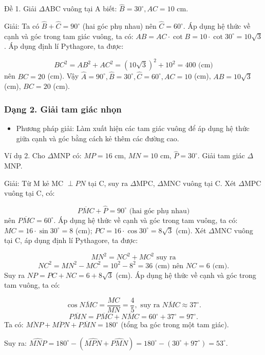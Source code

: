 \documentclass[%
    fontsize=12pt,%
    chapterprefix=false,%
    open=right,%
    twoside=false,%
    numbers=noenddot,%
    headings=optiontohead,%
    final,%
    DIV=15,%
    parskip=half %
]{scrbook}
\begin{document}

Đề 1. Giải $\Delta$ABC vuông tại A biết: $ \hat{B} = 30^\circ, AC = 10 $ cm.

Giải: Ta có $ \hat{B} + \hat{C} = 90^\circ $ (hai góc phụ nhau) nên $ \hat{C} = 60^\circ $. Áp dụng hệ thức về cạnh và góc trong tam giác vuông, ta có: $ AB = AC \cdot \cot B = 10 \cdot \cot 30^\circ = 10\sqrt{3} $. Áp dụng định lí Pythagore, ta được:

\[
BC^2 = AB^2 + AC^2 = \left(10\sqrt{3}\right)^2 + 10^2 = 400 \text{ (cm)}
\]
nên $ BC = 20 $ (cm). Vậy $ \hat{A} = 90^\circ, \hat{B} = 30^\circ, \hat{C} = 60^\circ, AC = 10 $ (cm), $ AB = 10\sqrt{3} $ (cm), $ BC = 20 $ (cm).
\subsubsection{Dạng 2. Giải tam giác nhọn}

\begin{itemize}
  \item Phương pháp giải: Làm xuất hiện các tam giác vuông để áp dụng hệ thức giữa cạnh và góc bằng cách kẻ thêm các đường cao.
\end{itemize}

Ví dụ 2. Cho $\Delta$MNP có: $ MP = 16 $ cm, $ MN = 10 $ cm, $ \hat{P} = 30^\circ $. Giải tam giác $\Delta$MNP.

Giải: Từ M kẻ MC $ \perp PN $ tại C, suy ra $\Delta$MPC, $\Delta$MNC vuông tại C. Xét $\Delta$MPC vuông tại C, có:

\[
\overline{PMC} + \hat{P} = 90^\circ \text{ (hai góc phụ nhau)}
\]
nên $ \overline{PMC} = 60^\circ $. Áp dụng hệ thức về cạnh và góc trong tam vuông, ta có: $ MC = 16 \cdot \sin 30^\circ = 8 $ (cm); $ PC = 16 \cdot \cos 30^\circ = 8\sqrt{3} $ (cm). Xét $\Delta$MNC vuông tại C, áp dụng định lí Pythagore, ta được:

\[
MN^2 = NC^2 + MC^2 \text{ suy ra}
\]
\[
NC^2 = MN^2 - MC^2 = 10^2 - 8^2 = 36 \text{ (cm)} \text{ nên } NC = 6 \text{ (cm)}.
\]
Suy ra $ NP = PC + NC = 6 + 8\sqrt{3} $ (cm). Áp dụng hệ thức về cạnh và góc trong tam vuông, ta có:

\[
\cos \overline{NMC} = \frac{MC}{MN} = \frac{4}{5}, \text{ suy ra } \overline{NMC} \approx 37^\circ.
\]
\[
\overline{PMN} = \overline{PMC} + \overline{NMC} = 60^\circ + 37^\circ = 97^\circ.
\]
Ta có: $ \overline{MNP} + \overline{MPN} + \overline{PMN} = 180^\circ $ (tổng ba góc trong một tam giác).


Suy ra: $ \widehat{MNP} = 180^\circ - (\widehat{MPN} + \widehat{PMN}) = 180^\circ - (30^\circ + 97^\circ) = 53^\circ $.
\end{document}
